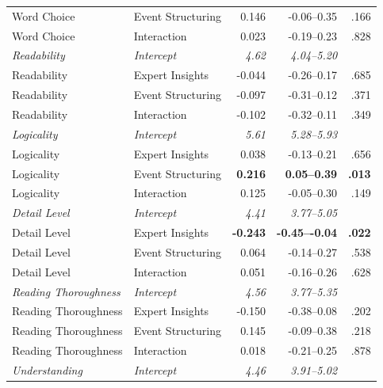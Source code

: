 \begin{table}[H]
\begin{tabular}{l l r r r}
  Word Choice           & Event Structuring & 0.146          & -0.06--0.35           & .166 \\
  Word Choice           & Interaction       & 0.023          & -0.19--0.23           & .828 \\
  \addlinespace
  \textit{Readability}         & \textit{Intercept}    & \textit{4.62}  & \textit{4.04--5.20}   & \\
  Readability           & Expert Insights   & -0.044         & -0.26--0.17           & .685 \\
  Readability           & Event Structuring & -0.097         & -0.31--0.12           & .371 \\
  Readability           & Interaction       & -0.102         & -0.32--0.11           & .349 \\
  \addlinespace
  \textit{Logicality}          & \textit{Intercept}    & \textit{5.61}  & \textit{5.28--5.93}   & \\
  Logicality            & Expert Insights   & 0.038          & -0.13--0.21           & .656 \\
  Logicality            & Event Structuring & \textbf{0.216} & \textbf{0.05--0.39} & \textbf{.013} \\
  Logicality            & Interaction       & 0.125          & -0.05--0.30           & .149 \\
  \addlinespace
  \textit{Detail Level}        & \textit{Intercept}    & \textit{4.41}  & \textit{3.77--5.05}   & \\
  Detail Level          & Expert Insights   & \textbf{-0.243}& \textbf{-0.45--{-0.04}} & \textbf{.022} \\
  Detail Level          & Event Structuring & 0.064          & -0.14--0.27           & .538 \\
  Detail Level          & Interaction       & 0.051          & -0.16--0.26           & .628 \\
  \addlinespace
  \textit{Reading Thoroughness}& \textit{Intercept}    & \textit{4.56}  & \textit{3.77--5.35}   & \\
  Reading Thoroughness  & Expert Insights   & -0.150         & -0.38--0.08           & .202 \\
  Reading Thoroughness  & Event Structuring & 0.145          & -0.09--0.38           & .218 \\
  Reading Thoroughness  & Interaction       & 0.018          & -0.21--0.25           & .878 \\
  \addlinespace
  \textit{Understanding}       & \textit{Intercept}    & \textit{4.46}  & \textit{3.91--5.02}   & \\

\end{tabular}
\end{table}
